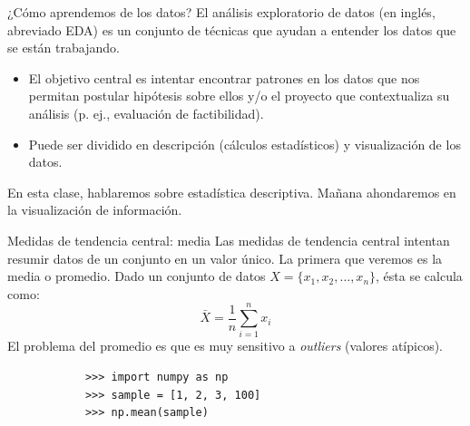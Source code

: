 \documentclass[aspectratio=169,handout]{beamer}
\begin{document}
    \begin{frame}{¿Cómo aprendemos de los datos?}
        El análisis exploratorio de datos (en inglés, abreviado EDA) es un conjunto de técnicas que ayudan a entender los datos que se están trabajando.
        \begin{itemize}
            \item El objetivo central es intentar encontrar patrones en los datos que nos permitan postular hipótesis sobre ellos y/o el proyecto que contextualiza su análisis (p. ej., evaluación de factibilidad).
            \pause
            \item Puede ser dividido en descripción (cálculos estadísticos) y visualización de los datos. 
        \end{itemize}
        \pause
        En esta clase, hablaremos sobre estadística descriptiva. Mañana ahondaremos en la visualización de información.
    \end{frame}

    \begin{frame}[fragile]{Medidas de tendencia central: media}
        Las medidas de tendencia central intentan resumir datos de un conjunto en un valor único. La primera que veremos es la media o promedio. Dado un conjunto de datos $X = \{x_1, x_2, \dots ,x_n\}$, ésta se calcula como:
        \[ 
            \bar{X} = \frac{1}{n} \sum^n_{i=1} x_i  
        \]
        \pause
        El problema del promedio es que es muy sensitivo a \emph{outliers} (valores atípicos).
        \pause
        \begin{verbatim}
            >>> import numpy as np
            >>> sample = [1, 2, 3, 100]
            >>> np.mean(sample)
        \end{verbatim}
    \end{frame}
\end{document}
